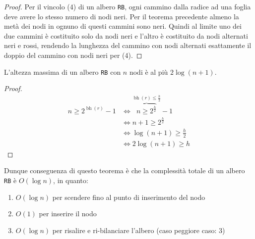         \begin{proof}
            Per il vincolo (4) di un albero \texttt{RB}, ogni cammino dalla radice ad una foglia deve avere lo stesso numero di nodi neri. Per il teorema precedente almeno la metà dei nodi in ognuno di questi cammini sono neri.\newline
            Quindi al limite uno dei due cammini è costituito solo da nodi neri e l'altro è costituito da nodi alternati neri e rossi, rendendo la lunghezza del cammino con nodi alternati esattamente il doppio del cammino con nodi neri per (4).
        \end{proof}
        \begin{theorem}
            L'altezza massima di un albero \texttt{RB} con $ n $ nodi è al più $ 2\log(n+1) $.
        \end{theorem}
        \begin{proof}
            $$
                \begin{aligned}
                    n\geq 2^{\operatorname{bh}(r)} -1 &\Leftrightarrow \overbrace{n\geq 2^{\frac{h}{2}}}^{\operatorname{bh}(r)\leq \frac{h}2} - 1\\
                    & \Leftrightarrow n+1\geq 2^{\frac{h}{2}}\\
                    & \Leftrightarrow \log(n+1)\geq \frac{h}{2}\\
                    & \Leftrightarrow 2\log(n+1)\geq h
                \end{aligned}
            $$
        \end{proof}
        Dunque conseguenza di questo teorema è che la complessità totale di un albero \texttt{RB} è $O(\log n)$, in quanto:
        \begin{enumerate}
            \item $O(\log n)$ per scendere fino al punto di inserimento del nodo
            \item $O(1)$ per inserire il nodo
            \item $O(\log n)$ per risalire e ri-bilanciare l'albero (caso peggiore caso: 3)
        \end{enumerate}
